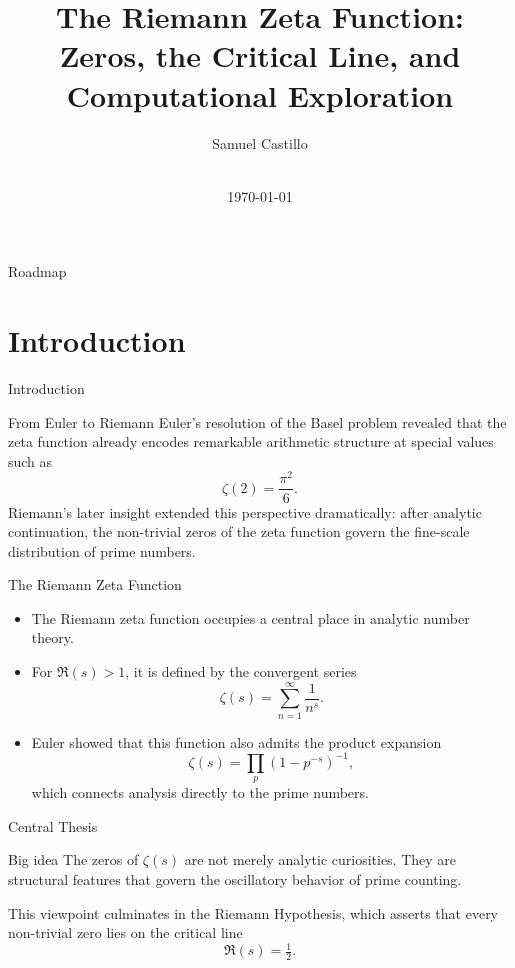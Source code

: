 \documentclass[aspectratio=43]{beamer}
\title[\meetingname]{The Riemann Zeta Function:\\Zeros, the Critical Line, and Computational Exploration}
\author[Samuel Castillo]{Samuel Castillo}
\institute[Predictive Insights AI]{www.PredictiveInsightsAI.com}
\date[\mydate]{\meetingname\\\today}
\begin{document}
\begin{frame}[plain]
\titlepage
\end{frame}

\begin{frame}{Roadmap}
\tableofcontents
\end{frame}

\section{Introduction}

\begin{frame}{Introduction}
\begin{block}{From Euler to Riemann}
Euler's resolution of the Basel problem revealed that the zeta function already
encodes remarkable arithmetic structure at special values such as
\[
\zeta(2)=\frac{\pi^2}{6}.
\]
Riemann's later insight extended this perspective dramatically: after analytic
continuation, the non-trivial zeros of the zeta function govern the fine-scale
distribution of prime numbers.
\end{block}
\end{frame}

\begin{frame}{The Riemann Zeta Function}
\begin{itemize}
\item The Riemann zeta function occupies a central place in analytic number theory.
\item For $\Re(s) > 1$, it is defined by the convergent series
\[
\zeta(s)=\sum_{n=1}^{\infty}\frac{1}{n^s}.
\]
\item Euler showed that this function also admits the product expansion
\[
\zeta(s)=\prod_{p}\left(1-p^{-s}\right)^{-1},
\]
which connects analysis directly to the prime numbers.
\end{itemize}
\end{frame}

\begin{frame}{Central Thesis}
\begin{block}{Big idea}
The zeros of $\zeta(s)$ are not merely analytic curiosities. They are structural
features that govern the oscillatory behavior of prime counting.
\end{block}

\medskip
This viewpoint culminates in the Riemann Hypothesis, which asserts that every
non-trivial zero lies on the critical line
\[
\Re(s)=\tfrac{1}{2}.
\]
\end{frame}
\end{document}
